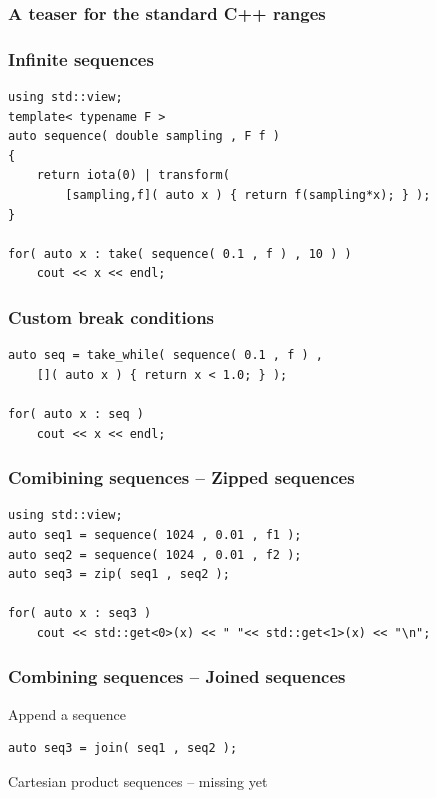 \documentclass{beamer}
\newcommand{\heading}[1]{\frametitle{#1}}
\begin{document}
\begin{frame}
 \heading{A teaser for the standard C++ ranges}
\end{frame}


\begin{frame}[fragile]
  \heading{Infinite sequences}
  
  \begin{lstlisting}[basicstyle=\scriptsize\ttfamily]
using std::view;
template< typename F >
auto sequence( double sampling , F f )
{
    return iota(0) | transform(
        [sampling,f]( auto x ) { return f(sampling*x); } );
}

for( auto x : take( sequence( 0.1 , f ) , 10 ) )
    cout << x << endl;
  \end{lstlisting}
  
\end{frame}

\begin{frame}[fragile]
  \heading{Custom break conditions}
  \begin{lstlisting}[basicstyle=\scriptsize\ttfamily]
auto seq = take_while( sequence( 0.1 , f ) ,
    []( auto x ) { return x < 1.0; } );

for( auto x : seq )
    cout << x << endl;
  \end{lstlisting}
  
\end{frame}


\begin{frame}[fragile]
  \heading{Comibining sequences -- Zipped sequences}
  
  \begin{lstlisting}[basicstyle=\scriptsize\ttfamily]
using std::view;
auto seq1 = sequence( 1024 , 0.01 , f1 );
auto seq2 = sequence( 1024 , 0.01 , f2 );
auto seq3 = zip( seq1 , seq2 );

for( auto x : seq3 )
    cout << std::get<0>(x) << " "<< std::get<1>(x) << "\n";
  \end{lstlisting}
  
\end{frame}
  
\begin{frame}[fragile]  
  \heading{Combining sequences -- Joined sequences}
  
  
  Append a sequence
  \begin{lstlisting}[basicstyle=\scriptsize\ttfamily]
auto seq3 = join( seq1 , seq2 );
  \end{lstlisting}
  
  \pause
  
  \vspace{2ex}
  Cartesian product sequences -- missing yet

\end{frame}
\end{document}
